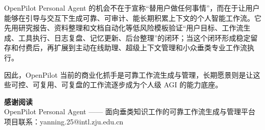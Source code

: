 \documentclass[12pt,a4paper]{ctexart}
\begin{document}
OpenPilot Personal Agent 的机会不在于宣称“替用户做任何事情”，而在于让用户能够在引导与交互下生成可靠、可审计、能长期积累上下文的个人智能工作流。它先用研究报告、资料整理和文档自动化等低风险模板验证“用户目标、工作流生成、工具执行、日志复盘、记忆更新、后台整理”的闭环；当这个闭环形成稳定留存和付费后，再扩展到主动在线助理、超级上下文管理和小众垂类专业工作流执行。

因此，OpenPilot 当前的商业化抓手是可靠工作流生成与管理，长期愿景则是让这些可控、可复用、可复盘的工作流逐步成为个人级 AGI 的能力底座。

\vfill
\begin{center}
  {\Large\bfseries 感谢阅读}\\[1cm]
  {\normalsize
    OpenPilot Personal Agent —— 面向垂类知识工作的可靠工作流生成与管理平台\\[0.3cm]
    项目联系：yanning.25@intl.zju.edu.cn \\[0.3cm]
  }
\end{center}

\newpage
\end{document}
